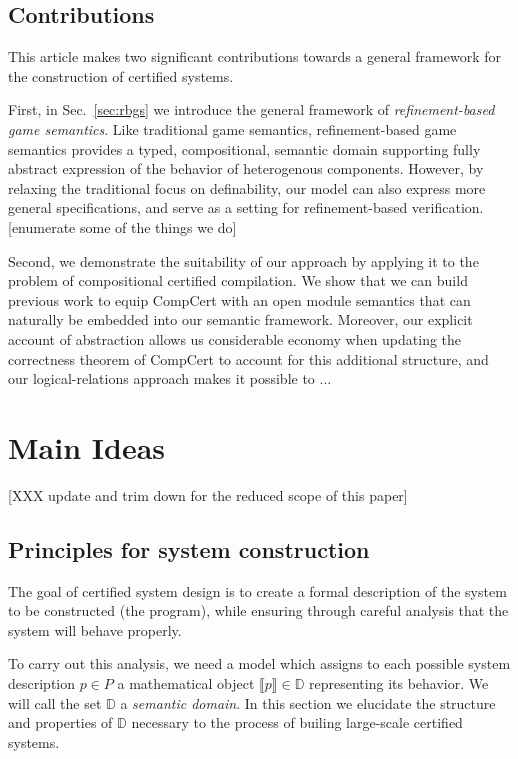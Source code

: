 \documentclass[acmsmall,timestamp,review]{acmart}
\begin{document}

\subsection{Contributions} %

This article makes two significant contributions
towards a general framework for the construction of certified systems.

First, in Sec.~\ref{sec:rbgs} we introduce the general framework of
\emph{refinement-based game semantics}.
Like traditional game semantics,
refinement-based game semantics provides
a typed, compositional, semantic domain
supporting fully abstract expression of
the behavior of heterogenous components.
However,
by relaxing the traditional focus on definability,
our model can also express more general specifications,
and serve as a setting for refinement-based verification.
[enumerate some of the things we do]

Second, we demonstrate the suitability of our approach
by applying it to the problem of compositional certified compilation.
We show that we can build previous work \cite{compcomp,sepcomp,popl15,cpp15}
to equip CompCert with an open module semantics
that can naturally be embedded into our semantic framework.
Moreover,
our explicit account of abstraction
allows us considerable economy
when updating the correctness theorem of CompCert
to account for this additional structure,
and our logical-relations approach
makes it possible to ...



\section{Main Ideas} \label{sec:mainideas} %

[XXX update and trim down for the reduced scope of this paper]

\subsection{Principles for system construction}

The goal of certified system design is
to create a formal description of
the system to be constructed (the program),
while ensuring through careful analysis that the system
will behave properly.

To carry out this analysis,
we need a model
which assigns to each possible system description $p \in P$
a mathematical object $\llbracket p \rrbracket \in \mathbb{D}$
representing its behavior.
We will call the set $\mathbb{D}$ a \emph{semantic domain}.
In this section we elucidate
the structure and properties of $\mathbb{D}$
necessary to the process of builing
large-scale certified systems.
\end{document}

